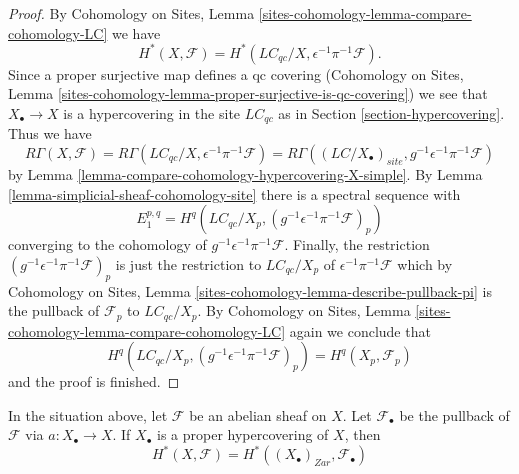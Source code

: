 \begin{proof}
By Cohomology on Sites, Lemma
\ref{sites-cohomology-lemma-compare-cohomology-LC}
we have
$$
H^*(X, \mathcal{F}) =
H^*(\textit{LC}_{qc}/X, \epsilon^{-1}\pi^{-1}\mathcal{F}).
$$
Since a proper surjective map defines a qc covering
(Cohomology on Sites, Lemma
\ref{sites-cohomology-lemma-proper-surjective-is-qc-covering})
we see that $X_\bullet \to X$ is a hypercovering in the site
$\textit{LC}_{qc}$ as in
Section \ref{section-hypercovering}.
Thus we have
$$
R\Gamma(X, \mathcal{F}) =
R\Gamma(\textit{LC}_{qc}/X, \epsilon^{-1}\pi^{-1}\mathcal{F}) =
R\Gamma((\textit{LC}/X_\bullet)_{site}, g^{-1}\epsilon^{-1}\pi^{-1}\mathcal{F})
$$
by Lemma \ref{lemma-compare-cohomology-hypercovering-X-simple}.
By Lemma \ref{lemma-simplicial-sheaf-cohomology-site}
there is a spectral sequence with
$$
E_1^{p, q} =
H^q(\textit{LC}_{qc}/X_p, (g^{-1}\epsilon^{-1}\pi^{-1}\mathcal{F})_p)
$$
converging to the cohomology of $g^{-1}\epsilon^{-1}\pi^{-1}\mathcal{F}$.
Finally, the restriction $(g^{-1}\epsilon^{-1}\pi^{-1}\mathcal{F})_p$
is just the restriction to $\textit{LC}_{qc}/X_p$ of
$\epsilon^{-1}\pi^{-1}\mathcal{F}$ which by
Cohomology on Sites, Lemma \ref{sites-cohomology-lemma-describe-pullback-pi}
is the pullback of $\mathcal{F}_p$ to $\textit{LC}_{qc}/X_p$.
By Cohomology on Sites, Lemma
\ref{sites-cohomology-lemma-compare-cohomology-LC}
again we conclude that
$$
H^q(\textit{LC}_{qc}/X_p, (g^{-1}\epsilon^{-1}\pi^{-1}\mathcal{F})_p)
= H^q(X_p, \mathcal{F}_p)
$$
and the proof is finished.
\end{proof}

\begin{lemma}
\label{lemma-compute-via-proper-hypercovering}
In the situation above, let $\mathcal{F}$ be an abelian sheaf on $X$.
Let $\mathcal{F}_\bullet$ be the pullback of $\mathcal{F}$ via
$a : X_\bullet \to X$. If $X_\bullet$ is a proper hypercovering
of $X$, then
$$
H^*(X, \mathcal{F}) = H^*((X_\bullet)_{Zar}, \mathcal{F}_\bullet)
$$
\end{lemma}

